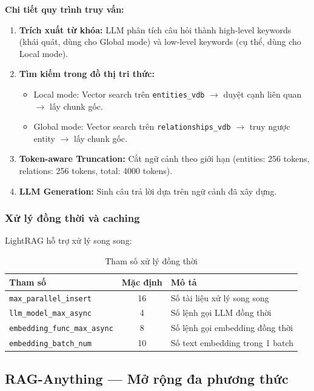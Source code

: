 \documentclass[12pt,a4paper]{article}
\begin{document}
\textbf{Chi tiết quy trình truy vấn:}

\begin{enumerate}
  \item \textbf{Trích xuất từ khóa:} LLM phân tích câu hỏi thành high-level keywords (khái quát, dùng cho Global mode) và low-level keywords (cụ thể, dùng cho Local mode).
  \item \textbf{Tìm kiếm trong đồ thị tri thức:}
    \begin{itemize}
      \item Local mode: Vector search trên \texttt{entities\_vdb} $\to$ duyệt cạnh liên quan $\to$ lấy chunk gốc.
      \item Global mode: Vector search trên \texttt{relationships\_vdb} $\to$ truy ngược entity $\to$ lấy chunk gốc.
    \end{itemize}
  \item \textbf{Token-aware Truncation:} Cắt ngữ cảnh theo giới hạn (entities: 256 tokens, relations: 256 tokens, total: 4000 tokens).
  \item \textbf{LLM Generation:} Sinh câu trả lời dựa trên ngữ cảnh đã xây dựng.
\end{enumerate}

\subsubsection{Xử lý đồng thời và caching}

LightRAG hỗ trợ xử lý song song:

\begin{table}[H]
\centering
\caption{Tham số xử lý đồng thời}
\begin{tabular}{lcp{6cm}}
\toprule
\textbf{Tham số} & \textbf{Mặc định} & \textbf{Mô tả} \\
\midrule
\texttt{max\_parallel\_insert} & 16 & Số tài liệu xử lý song song \\
\texttt{llm\_model\_max\_async} & 4 & Số lệnh gọi LLM đồng thời \\
\texttt{embedding\_func\_max\_async} & 8 & Số lệnh gọi embedding đồng thời \\
\texttt{embedding\_batch\_num} & 10 & Số text embedding trong 1 batch \\
\bottomrule
\end{tabular}
\end{table}

\subsection{RAG-Anything --- Mở rộng đa phương thức}
\end{document}
